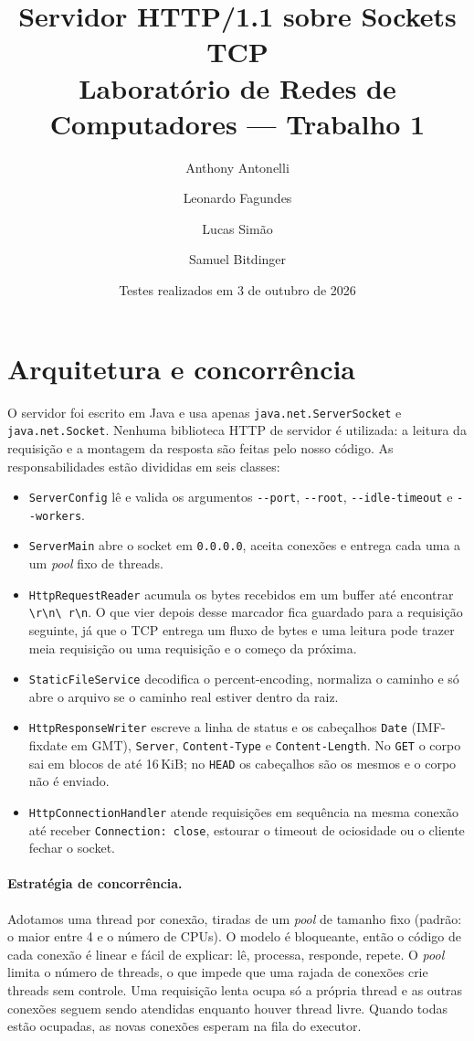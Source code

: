 \documentclass[11pt,a4paper]{article}
\title{Servidor HTTP/1.1 sobre Sockets TCP\\[4pt]
\large Laboratório de Redes de Computadores --- Trabalho 1}
\author{Anthony Antonelli \and Leonardo Fagundes \and Lucas Simão \and Samuel Bitdinger}
\date{Testes realizados em 3 de outubro de 2026}
\newcommand{\cod}[1]{\texttt{#1}}
\begin{document}
\maketitle

\section{Arquitetura e concorrência}

O servidor foi escrito em Java e usa apenas \cod{java.net.ServerSocket} e
\cod{java.net.Socket}. Nenhuma biblioteca HTTP de servidor é utilizada: a
leitura da requisição e a montagem da resposta são feitas pelo nosso código.
As responsabilidades estão divididas em seis classes:

\begin{itemize}
  \item \cod{ServerConfig} lê e valida os argumentos \cod{-{}-port},
  \cod{-{}-root}, \cod{-{}-idle-timeout} e \cod{-{}-workers}.
  \item \cod{ServerMain} abre o socket em \cod{0.0.0.0}, aceita conexões e
  entrega cada uma a um \emph{pool} fixo de threads.
  \item \cod{HttpRequestReader} acumula os bytes recebidos em um buffer até
  encontrar \cod{\textbackslash r\textbackslash n\textbackslash
  r\textbackslash n}. O que vier depois desse marcador fica guardado para a
  requisição seguinte, já que o TCP entrega um fluxo de bytes e uma leitura
  pode trazer meia requisição ou uma requisição e o começo da próxima.
  \item \cod{StaticFileService} decodifica o percent-encoding, normaliza o
  caminho e só abre o arquivo se o caminho real estiver dentro da raiz.
  \item \cod{HttpResponseWriter} escreve a linha de status e os cabeçalhos
  \cod{Date} (IMF-fixdate em GMT), \cod{Server}, \cod{Content-Type} e
  \cod{Content-Length}. No \cod{GET} o corpo sai em blocos de até 16\,KiB; no
  \cod{HEAD} os cabeçalhos são os mesmos e o corpo não é enviado.
  \item \cod{HttpConnectionHandler} atende requisições em sequência na mesma
  conexão até receber \cod{Connection: close}, estourar o timeout de
  ociosidade ou o cliente fechar o socket.
\end{itemize}

\paragraph{Estratégia de concorrência.} Adotamos uma thread por conexão,
tiradas de um \emph{pool} de tamanho fixo (padrão: o maior entre 4 e o número
de CPUs). O modelo é bloqueante, então o código de cada conexão é linear e
fácil de explicar: lê, processa, responde, repete. O \emph{pool} limita o
número de threads, o que impede que uma rajada de conexões crie threads sem
controle. Uma requisição lenta ocupa só a própria thread e as outras conexões
seguem sendo atendidas enquanto houver thread livre. Quando todas estão
ocupadas, as novas conexões esperam na fila do executor.
\end{document}
